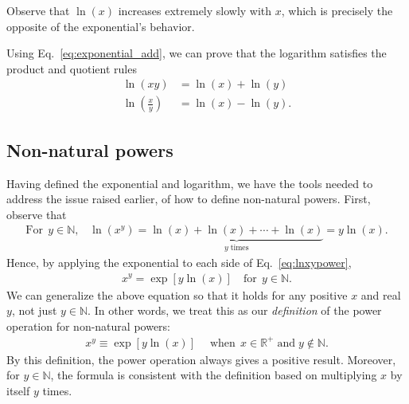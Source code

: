 \documentclass[10pt,a4paper]{article}
\begin{document}
\noindent
Observe that $\ln(x)$ increases extremely slowly with $x$, which is
precisely the opposite of the exponential's behavior.

Using Eq.~\eqref{eq:exponential_add}, we can prove that the logarithm
satisfies the product and quotient rules
\begin{align}
  \ln(xy) &= \ln(x) + \ln(y) \\
  \ln\left(\frac{x}{y}\right) &= \ln(x) - \ln(y).
\end{align}

\subsection{Non-natural powers}
\label{powers}

Having defined the exponential and logarithm, we have the tools needed
to address the issue raised earlier, of how to define non-natural
powers.  First, observe that
\begin{align}
  \textrm{For}\;\,y \in \mathbb{N}, \;\;\;\ln(x^y) = \underbrace{\ln(x)+\ln(x)+\cdots+\ln(x)}_{y\;\text{times}} = y \ln(x).
  \label{eq:lnxypower}
\end{align}
Hence, by applying the exponential to each side of
Eq.~\eqref{eq:lnxypower},
\begin{align}
  x^y = \exp[y \ln(x)] \quad \mathrm{for} \;\,y \in \mathbb{N}.
\end{align}
We can generalize the above equation so that it holds for any positive
$x$ and real $y$, not just $y \in \mathbb{N}$.  In other words, we
treat this as our \textit{definition} of the power operation for
non-natural powers:
\begin{align}
  x^y \equiv \exp[y \ln(x)] \quad\; \mathrm{when}\;\, x \in \mathbb{R}^+\;\textrm{and}\;y \notin \mathbb{N}.
\end{align}
By this definition, the power operation always gives a positive
result.  Moreover, for $y \in \mathbb{N}$, the formula is consistent
with the definition based on multiplying $x$ by itself $y$ times.
\end{document}
